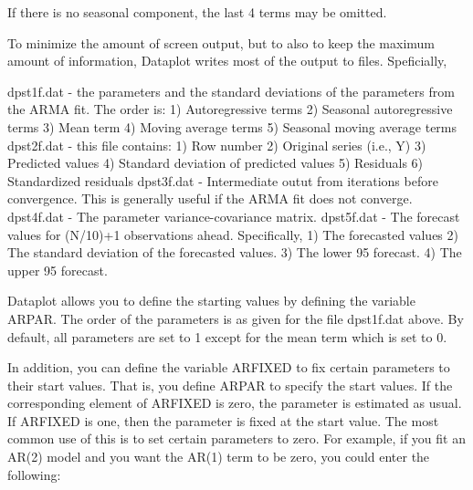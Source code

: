 {       If there is no seasonal component, the last 4 terms may be
       omitted.

       To minimize the amount of screen output, but to also to
       keep the maximum amount of information, Dataplot writes
       most of the output to files.  Speficially,

          dpst1f.dat - the parameters and the standard deviations
                       of the parameters from the ARMA fit.  The
                       order is:
                       1) Autoregressive terms
                       2) Seasonal autoregressive terms
                       3) Mean term
                       4) Moving average terms
                       5) Seasonal moving average terms
          dpst2f.dat - this file contains:
                       1) Row number
                       2) Original series (i.e., Y)
                       3) Predicted values
                       4) Standard deviation of predicted values
                       5) Residuals
                       6) Standardized residuals
          dpst3f.dat - Intermediate outut from iterations before
                       convergence.  This is generally useful if
                       the ARMA fit does not converge.
          dpst4f.dat - The parameter variance-covariance matrix.
          dpst5f.dat - The forecast values for (N/10)+1 observations
                       ahead.  Specifically,
                       1) The forecasted values
                       2) The standard deviation of the forecasted
                          values.
                       3) The lower 95%
                          forecast.
                       4) The upper 95%
                          forecast.

       Dataplot allows you to define the starting values by
       defining the variable ARPAR.  The order of the parameters
       is as given for the file dpst1f.dat above.  By default,
       all parameters are set to 1 except for the mean term which
       is set to 0.

       In addition, you can define the variable ARFIXED to fix
       certain parameters to their start values.  That is, you
       define ARPAR to specify the start values.  If the
       corresponding element of ARFIXED is zero, the parameter is
       estimated as usual.  If ARFIXED is one, then the parameter
       is fixed at the start value.  The most common use of this
       is to set certain parameters to zero.  For example, if
       you fit an AR(2) model and you want the AR(1) term to be
       zero, you could enter the following:

}
